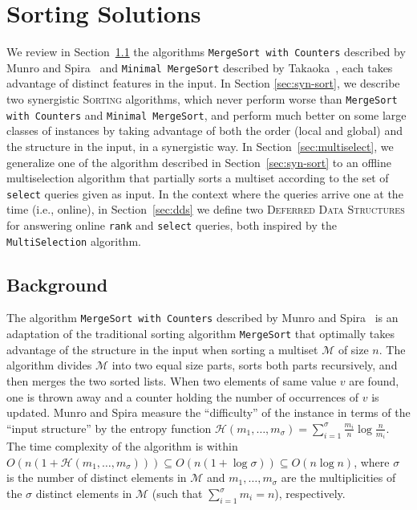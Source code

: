 \section{Sorting Solutions}
\label{sec:sort}

We review in Section~\ref{sec:back} the algorithms \texttt{MergeSort
  with Counters} described by Munro and
Spira~\cite{1976-JComp-SortingAndSearchingInMultisets-MunroSpira} and
\texttt{Minimal MergeSort} described by
Takaoka~\cite{2009-Chapter-PartialSolutionAndEntropy-Takaoka}, each
takes advantage of distinct features in the input. In Section
\ref{sec:syn-sort}, we describe two synergistic \textsc{Sorting}
algorithms, which never perform worse than \texttt{MergeSort with
  Counters} and \texttt{Minimal MergeSort}, and perform much better on
some large classes of instances by taking advantage of both the order
(local and global) and the structure in the input, in a synergistic
way. In Section~\ref{sec:multiselect}, we generalize one of the
algorithm described in Section~\ref{sec:syn-sort} to an offline
multiselection algorithm that partially sorts a multiset according to
the set of \texttt{select} queries given as input. In the context
where the queries arrive one at the time (i.e., online), in
Section~\ref{sec:dds} we define two \textsc{Deferred Data Structures}
for answering online \texttt{rank} and \texttt{select} queries, both
inspired by the \texttt{MultiSelection} algorithm.

\subsection{Background}
\label{sec:back}

The algorithm \texttt{MergeSort with Counters} described by Munro and
Spira~\cite{1976-JComp-SortingAndSearchingInMultisets-MunroSpira} is
an adaptation of the traditional sorting algorithm \texttt{MergeSort}
that optimally takes advantage of the structure in the input when
sorting a multiset $\mathcal{M}$ of size $n$. The algorithm divides
$\mathcal{M}$ into two equal size parts, sorts both parts recursively,
and then merges the two sorted lists. When two elements of same value $v$ are
found, one is thrown away and a counter holding the number of occurrences
of $v$ is updated. Munro and Spira measure the
``difficulty'' of the instance in terms of the ``input structure'' by
the entropy function
$\mathcal{H}(m_1, \dots, m_\sigma) =
\sum_{i=1}^\sigma{\frac{m_i}{n}}\log{\frac{n}{m_i}}$.  The time
complexity of the algorithm is within
$O(n(1 + \mathcal{H}(m_1, \dots, m_\sigma))) \subseteq
O(n(1{+}\log{\sigma})) \subseteq O(n\log{n})$, where $\sigma$ is the
number of distinct elements in $\mathcal{M}$ and
$m_1, \dots, m_\sigma$ are the multiplicities of the $\sigma$ distinct
elements in $\mathcal{M}$ (such that $\sum_{i=1}^\sigma {m_i}=n$),
respectively.

